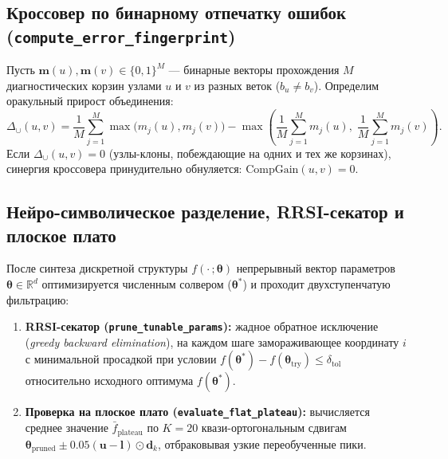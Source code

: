 \documentclass[11pt,a4paper]{article}
\begin{document}
\subsection{Кроссовер по бинарному отпечатку ошибок (\texttt{compute\_error\_fingerprint})}
Пусть $\mathbf{m}(u), \mathbf{m}(v) \in \{0, 1\}^M$ — бинарные векторы прохождения $M$ диагностических корзин узлами $u$ и $v$ из разных веток ($b_u \ne b_v$). Определим оракульный прирост объединения:
\begin{equation}
\Delta_{\cup}(u, v) = \frac{1}{M}\sum_{j=1}^M \max\bigl(m_j(u), m_j(v)\bigr) - \max\left(\frac{1}{M}\sum_{j=1}^M m_j(u), \; \frac{1}{M}\sum_{j=1}^M m_j(v)\right).
\end{equation}
Если $\Delta_{\cup}(u, v) = 0$ (узлы-клоны, побеждающие на одних и тех же корзинах), синергия кроссовера принудительно обнуляется: $\text{CompGain}(u, v) = 0$.

\subsection{Нейро-символическое разделение, RRSI-секатор и плоское плато}
После синтеза дискретной структуры $f(\cdot\,; \boldsymbol{\theta})$ непрерывный вектор параметров $\boldsymbol{\theta} \in \mathbb{R}^d$ оптимизируется численным солвером ($\boldsymbol{\theta}^*$) и проходит двухступенчатую фильтрацию:
\begin{enumerate}
\item \textbf{RRSI-секатор (\texttt{prune\_tunable\_params}):} жадное обратное исключение (\emph{greedy backward elimination}), на каждом шаге замораживающее координату $i$ с минимальной просадкой при условии $f(\boldsymbol{\theta}^*) - f(\boldsymbol{\theta}_{\text{try}}) \le \delta_{\text{tol}}$ относительно исходного оптимума $f(\boldsymbol{\theta}^*)$.
\item \textbf{Проверка на плоское плато (\texttt{evaluate\_flat\_plateau}):} вычисляется среднее значение $\bar{f}_{\text{plateau}}$ по $K=20$ квази-ортогональным сдвигам $\boldsymbol{\theta}_{\text{pruned}} \pm 0.05(\mathbf{u} - \mathbf{l}) \odot \mathbf{d}_k$, отбраковывая узкие переобученные пики.
\end{enumerate}
\end{document}

